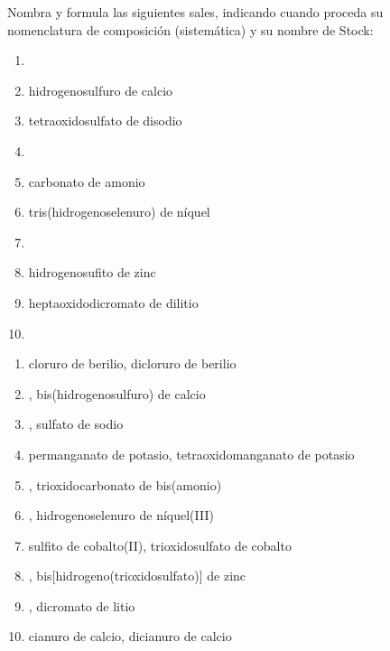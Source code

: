 \begin{exercise}[
    tags    = {inorgánica,sales, sales binarias,sales ternarias},
    topics  = {química inorgánica,formulación,nomenclatura},
    source  = {SAN Formulación, p29, e37},
  ]
  Nombra y formula las siguientes sales, indicando cuando proceda su nomenclatura de composición (sistemática) y su nombre de Stock:

  \begin{enumerate}
    \item {}
    \item hidrogenosulfuro de calcio
    \item tetraoxidosulfato de disodio
    \item {}
    \item carbonato de amonio
    \item tris(hidrogenoselenuro) de níquel
    \item {}
    \item hidrogenosufito de zinc
    \item heptaoxidodicromato de dilitio
    \item {}
  \end{enumerate}
\end{exercise}

\begin{solution}
  \begin{enumerate}
    \item cloruro de berilio, dicloruro de berilio
    \item {}, bis(hidrogenosulfuro) de calcio
    \item {}, sulfato de sodio
    \item permanganato de potasio, tetraoxidomanganato de potasio
    \item {}, trioxidocarbonato de bis(amonio)
    \item {}, hidrogenoselenuro de níquel(III)
    \item sulfito de cobalto(II), trioxidosulfato de cobalto
    \item {}, bis[hidrogeno(trioxidosulfato)] de zinc
    \item {}, dicromato de litio
    \item cianuro de calcio, dicianuro de calcio
  \end{enumerate}
\end{solution}





